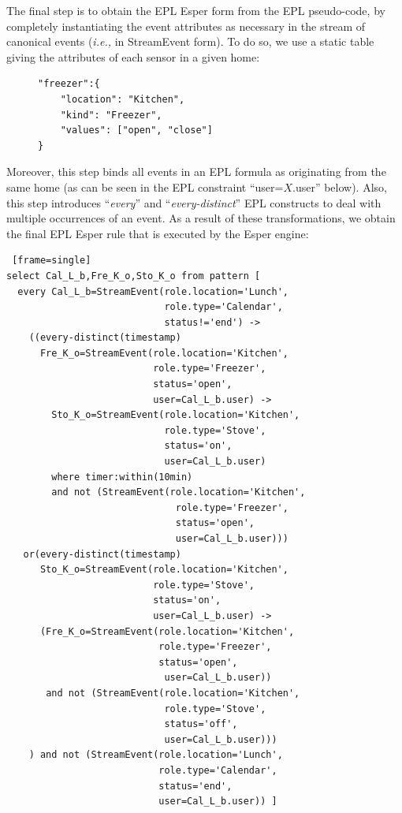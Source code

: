 The final step is to obtain the EPL Esper form from the EPL pseudo-code, by completely instantiating the event attributes as necessary in the stream of canonical events ({\em i.e.,} in StreamEvent form). To do so, we use a static table giving the attributes of each sensor in a given home:

\begin{figure}[h]
\begin{footnotesize}
\begin{Verbatim}
"freezer":{
	"location": "Kitchen",
	"kind": "Freezer",
	"values": ["open", "close"]
}
\end{Verbatim}
\end{footnotesize}
\end{figure}

Moreover, this step binds all events in an EPL formula as originating from the same home (as can be seen in the EPL constraint ``{\ttfamily user=$X$.user}'' below).  Also, this step introduces ``{\em every}'' and ``{\em every-distinct}'' EPL constructs to deal with multiple occurrences of an event. As a result of these transformations, we obtain the final EPL Esper rule that is executed by the Esper engine:

\begin{footnotesize}
\begin{lstlisting} [frame=single]
select Cal_L_b,Fre_K_o,Sto_K_o from pattern [ 
  every Cal_L_b=StreamEvent(role.location='Lunch',
                            role.type='Calendar',
                            status!='end') -> 
    ((every-distinct(timestamp)
      Fre_K_o=StreamEvent(role.location='Kitchen',
                          role.type='Freezer',
                          status='open',
                          user=Cal_L_b.user) -> 
        Sto_K_o=StreamEvent(role.location='Kitchen',
                            role.type='Stove',
                            status='on',
                            user=Cal_L_b.user) 
        where timer:within(10min)
        and not (StreamEvent(role.location='Kitchen',
                              role.type='Freezer',
                              status='open',
                              user=Cal_L_b.user))) 
   or(every-distinct(timestamp)
      Sto_K_o=StreamEvent(role.location='Kitchen',
                          role.type='Stove',
                          status='on',
                          user=Cal_L_b.user) -> 
      (Fre_K_o=StreamEvent(role.location='Kitchen',
                           role.type='Freezer',
                           status='open',
                            user=Cal_L_b.user)) 
       and not (StreamEvent(role.location='Kitchen',
                            role.type='Stove',
                            status='off',
                            user=Cal_L_b.user))) 
    ) and not (StreamEvent(role.location='Lunch',
                           role.type='Calendar',
                           status='end',
                           user=Cal_L_b.user)) ]
\end{lstlisting}
\end{footnotesize}

